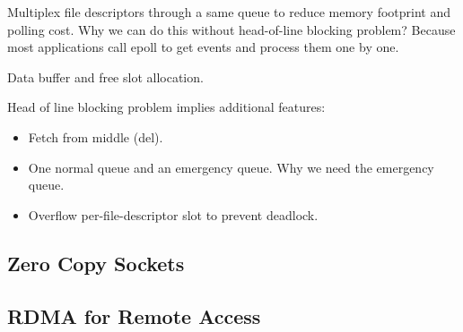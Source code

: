 Multiplex file descriptors through a same queue to reduce memory footprint and polling cost. Why we can do this without head-of-line blocking problem? Because most applications call epoll to get events and process them one by one.


Data buffer and free slot allocation.

Head of line blocking problem implies additional features:
\begin{itemize}
	\item Fetch from middle (del).
	\item One normal queue and an emergency queue. Why we need the emergency queue.
	\item Overflow per-file-descriptor slot to prevent deadlock.
\end{itemize}




\subsection{Zero Copy Sockets}

\subsection{RDMA for Remote Access}

